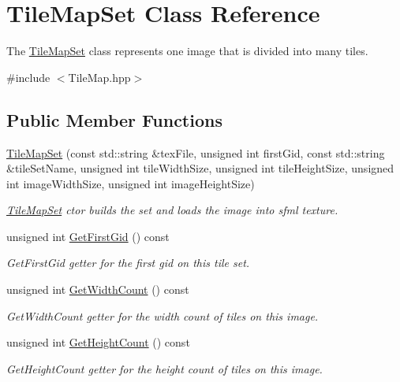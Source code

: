 \hypertarget{class_tile_map_set}{\section{Tile\-Map\-Set Class Reference}
\label{class_tile_map_set}
}


The \hyperlink{class_tile_map_set}{Tile\-Map\-Set} class represents one image that is divided into many tiles.  




{\ttfamily \#include $<$Tile\-Map.\-hpp$>$}

\subsection*{Public Member Functions}
\begin{DoxyCompactItemize}
\item 
\hyperlink{class_tile_map_set_a34d33c801d9c62d9c95049c270e83002}{Tile\-Map\-Set} (const std\-::string \&tex\-File, unsigned int first\-Gid, const std\-::string \&tile\-Set\-Name, unsigned int tile\-Width\-Size, unsigned int tile\-Height\-Size, unsigned int image\-Width\-Size, unsigned int image\-Height\-Size)
\begin{DoxyCompactList}\small\item\em \hyperlink{class_tile_map_set}{Tile\-Map\-Set} ctor builds the set and loads the image into sfml texture. \end{DoxyCompactList}\item 
unsigned int \hyperlink{class_tile_map_set_a510130a6caf01a72483600ce6497a2b3}{Get\-First\-Gid} () const 
\begin{DoxyCompactList}\small\item\em Get\-First\-Gid getter for the first gid on this tile set. \end{DoxyCompactList}\item 
unsigned int \hyperlink{class_tile_map_set_a31f0031164701fe7d98dc7683e6c35f5}{Get\-Width\-Count} () const 
\begin{DoxyCompactList}\small\item\em Get\-Width\-Count getter for the width count of tiles on this image. \end{DoxyCompactList}\item 
unsigned int \hyperlink{class_tile_map_set_a33bf48147ee5eb77efbfd45da82f60ee}{Get\-Height\-Count} () const 
\begin{DoxyCompactList}\small\item\em Get\-Height\-Count getter for the height count of tiles on this image. \end{DoxyCompactList}\item 

\end{DoxyCompactItemize}
